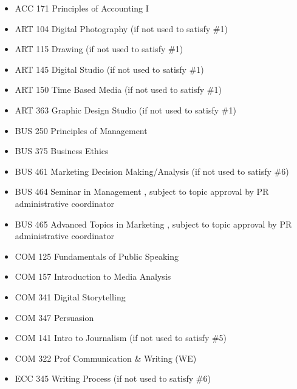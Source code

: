 \documentclass[
  letterpaper,
]{scrbook}
\providecommand{\tightlist}{%
  \setlength{\itemsep}{0pt}\setlength{\parskip}{0pt}}
\begin{document}
\begin{enumerate}
  \begin{itemize}
  \tightlist
  \item
    ACC 171 Principles of Accounting I\\
  \item
    ART 104 Digital Photography (if not used to satisfy \#1)\\
  \item
    ART 115 Drawing (if not used to satisfy \#1)\\
  \item
    ART 145 Digital Studio (if not used to satisfy \#1)\\
  \item
    ART 150 Time Based Media (if not used to satisfy \#1)\\
  \item
    ART 363 Graphic Design Studio (if not used to satisfy \#1)\\
  \item
    BUS 250 Principles of Management\\
  \item
    BUS 375 Business Ethics\\
  \item
    BUS 461 Marketing Decision Making/Analysis (if not used to satisfy
    \#6)\\
  \item
    BUS 464 Seminar in Management , subject to topic approval by PR
    administrative coordinator\\
  \item
    BUS 465 Advanced Topics in Marketing , subject to topic approval by
    PR administrative coordinator\\
  \item
    COM 125 Fundamentals of Public Speaking\\
  \item
    COM 157 Introduction to Media Analysis\\
  \item
    COM 341 Digital Storytelling\\
  \item
    COM 347 Persuasion\\
  \item
    COM 141 Intro to Journalism (if not used to satisfy \#5)\\
  \item
    COM 322 Prof Communication \& Writing (WE)\\
  \item
    ECC 345 Writing Process (if not used to satisfy \#6)
  \end{itemize}
\end{enumerate}
\end{document}
